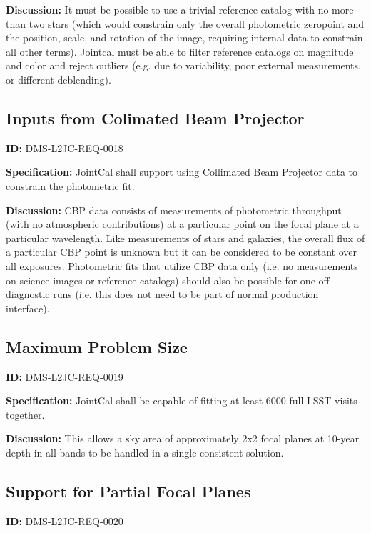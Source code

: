 \documentclass[SE,toc,lsstdraft]{lsstdoc}
\begin{document}
\textbf{Discussion:}
It must be possible to use a trivial reference catalog with no more than two stars (which would constrain only the overall photometric zeropoint and the position, scale, and rotation of the image, requiring internal data to constrain all other terms).  Jointcal must be able to filter reference catalogs on magnitude and color and reject outliers (e.g. due to variability, poor external measurements, or different deblending).

\subsection{Inputs from Colimated Beam Projector}

\label{DMS-L2JC-REQ-0018}
\textbf{ID:} DMS-L2JC-REQ-0018

\textbf{Specification:}
JointCal shall support using Collimated Beam Projector data to constrain the photometric fit.

\textbf{Discussion:}
CBP data consists of measurements of photometric throughput (with no atmospheric contributions) at a particular point on the focal plane at a particular wavelength. Like measurements of stars and galaxies, the overall flux of a particular CBP point is unknown but it can be considered to be constant over all exposures. Photometric fits that utilize CBP data only (i.e. no measurements on science images or reference catalogs) should also be possible for one-off diagnostic runs (i.e. this does not need to be part of normal production interface).

\subsection{Maximum Problem Size}

\label{DMS-L2JC-REQ-0019}
\textbf{ID:} DMS-L2JC-REQ-0019

\textbf{Specification:}
JointCal shall be capable of fitting at least 6000 full LSST visits together.

\textbf{Discussion:}
This allows a sky area of approximately 2x2 focal planes at 10-year depth in all bands to be handled in a single consistent solution.

\subsection{Support for Partial Focal Planes}

\label{DMS-L2JC-REQ-0020}
\textbf{ID:} DMS-L2JC-REQ-0020
\end{document}

